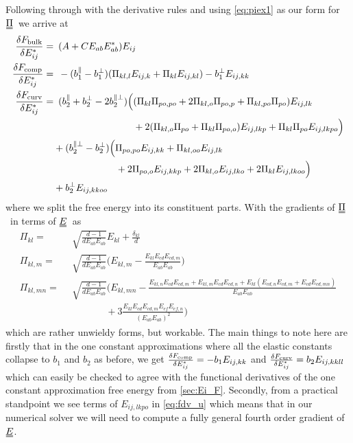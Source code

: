 \documentclass[12pt]{article}
\newcommand{\duf}[2]{\stackunder[0.5pt]{\stackunder[0.8pt]{\stackunder[1pt]{\ensuremath{#1}}{\rule{\widthof{\ensuremath{#2}}*\real{0.9}}{.1ex}}}{\rule{\widthof{\ensuremath{#2}}*\real{0.9}}{.1ex}}}{}}
\newcommand{\du}[1]{\duf{#1}{#1}}
\newcommand{\EE}{\ensuremath{\du{E}}}
\newcommand{\PP}{\ensuremath{\du{\Pi}}}
\begin{document}
        Following through with the derivative rules and using \cref{eq:piex1} as our form for \PP\ we arrive at
        \begin{align}
            \fdv{F_\text{bulk}}{E_{ij}^*} =&\enspace \qty(A + C E_{ab}E_{ab}^*)E_{ij} \label{eq:fdv_b} \\
            \fdv{F_\text{comp}}{E_{ij}^*} =&\enspace -(b_1^\parallel - b_1^\perp) (\Pi_{kl,l} E_{ij,k} + \Pi_{kl} E_{ij,kl}) - b_1^\perp E_{ij,kk} \label{eq:fdv_c} \\
            \fdv{F_\text{curv}}{E_{ij}^*} =&\enspace (b_2^\parallel + b_2^\perp - 2b_2^{\parallel\perp}) \Bigl( (\Pi_{kl}\Pi_{po,po} + 2\Pi_{kl,o}\Pi_{po,p} + \Pi_{kl,po}\Pi_{po})E_{ij,lk} \label{eq:fdv_u} \\
            &\phantom{\enspace (b_2^\parallel + b_2^\perp - 2b_2^{\parallel\perp}) \Bigl(}+ 2(\Pi_{kl,o}\Pi_{po} + \Pi_{kl}\Pi_{po,o})E_{ij,lkp} + \Pi_{kl}\Pi_{po}E_{ij,lkpo} \Bigr) \nonumber \\
            &+ (b_2^{\parallel\perp} - b_2^\perp)\Bigl( \Pi_{po,po}E_{ij,kk} + \Pi_{kl,oo}E_{ij,lk} \nonumber \\ 
            &\phantom{\enspace+ (b_2^{\parallel\perp} - b_2^\perp)\Bigl(}+ 2\Pi_{po,o}E_{ij,kkp} + 2\Pi_{kl,o}E_{ij,lko} + 2\Pi_{kl}E_{ij,lkoo} \Bigr) \nonumber \\ 
            &+ b_2^\perp E_{ij,kkoo} \nonumber
        \end{align}
        where we split the free energy into its constituent parts.
        With the gradients of \PP\ in terms of \EE\ as
        \begin{align}
            \Pi_{kl} =&\enspace \sqrt{\frac{d-1}{dE_{ab}E_{ab}}} E_{kl} + \frac{\delta_{kl}}{d} \label{eq:pig0} \\
            \Pi_{kl,m} =&\enspace \sqrt{\frac{d-1}{dE_{ab}E_{ab}}} \biggl(E_{kl,m} - \frac{E_{kl}E_{cd}E_{cd,m}}{E_{ab}E_{ab}}\biggr) \label{eq:pig1} \\
            \Pi_{kl,mn} =&\enspace \sqrt{\frac{d-1}{dE_{ab}E_{ab}}} \biggl(E_{kl,mn} - \frac{E_{kl,n}E_{cd}E_{cd,m} + E_{kl,m}E_{cd}E_{cd,n} + E_{kl}(E_{cd,n}E_{cd,m} + E_{cd}E_{cd,mn})}{E_{ab}E_{ab}} \label{eq:pig2} \\
            &\phantom{\sqrt{\frac{d-1}{dE_{ab}E_{ab}}} \Biggl(} + 3\frac{E_{kl}E_{cd}E_{cd,m}E_{ef}E_{ef,n}}{(E_{ab}E_{ab})^2} \biggr) \nonumber
        \end{align}
        which are rather unwieldy forms, but workable.
        The main things to note here are firstly that in the one constant approximations where all the elastic constants collapse to $b_1$ and $b_2$ as before, we get $\fdv{F_\text{comp}}{E_{ij}^*} = -b_1 E_{ij,kk}$ and $\fdv{F_\text{curv}}{E_{ij}^*} = b_2 E_{ij,kkll}$ which can easily be checked to agree with the functional derivatives of the one constant approximation free energy from \cref{sec:Ei_F}.
        Secondly, from a practical standpoint we see terms of $E_{ij,lkpo}$ in \cref{eq:fdv_u} which means that in our numerical solver we will need to compute a fully general fourth order gradient of \EE.
\end{document}
